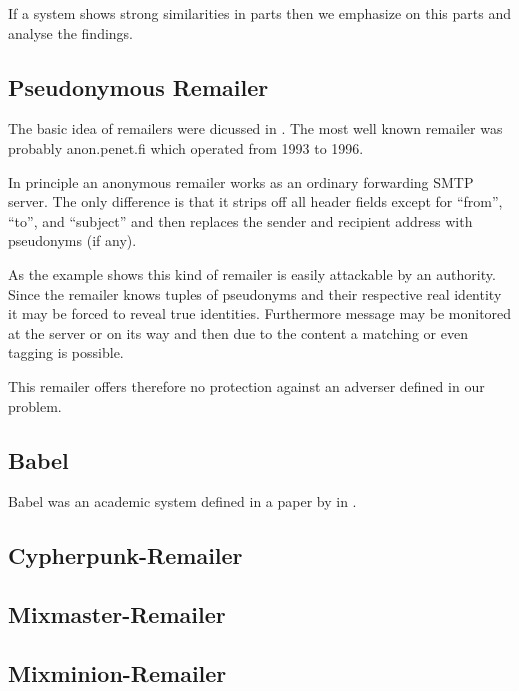 If a system shows strong similarities in parts then we emphasize on this parts and analyse the findings.

\subsection{Pseudonymous Remailer\label{sec:remPseudo}}
The basic idea of remailers were dicussed in \cite{CHAUM1}. The most well known remailer was probably anon.penet.fi which operated from 1993 to 1996. 

In principle an anonymous remailer works as an ordinary forwarding SMTP server. The only difference is that it strips off all header fields except for ``from'', ``to'', and ``subject'' and then replaces the sender and recipient address with pseudonyms (if any). 

As the example shows this kind of remailer is easily attackable by an authority. Since the remailer knows tuples of pseudonyms and their respective real identity it may be forced to reveal true identities. Furthermore message may be monitored at the server or on its way and then due to the content a matching or even tagging is possible.

This remailer offers therefore no protection against an adverser defined in our problem.

\subsection{Babel}
Babel was an academic system defined in a paper by \citeauthor{babel} in \citeyear{babel}\cite{babel}.


\subsection{Cypherpunk-Remailer\label{sec:remCypherpunk}}

\subsection{Mixmaster-Remailer\label{sec:remMixmaster}}

\subsection{Mixminion-Remailer\label{sec:remMixminion}}

